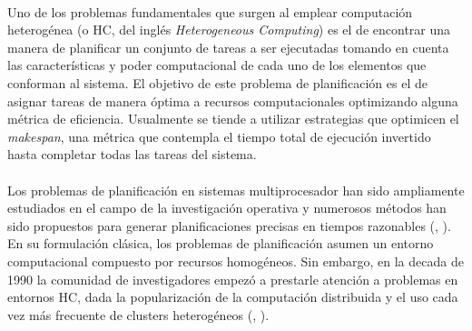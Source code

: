 \paragraph{}Uno de los problemas fundamentales que surgen al emplear computación heterogénea (o HC, del inglés \textit{Heterogeneous Computing}) es el de encontrar una manera de planificar un conjunto de tareas a ser ejecutadas tomando en cuenta las características y poder computacional de cada uno de los elementos que conforman al sistema.
El objetivo de este problema de planificación es el de asignar tareas de manera óptima a recursos computacionales optimizando alguna métrica de eficiencia.
Usualmente se tiende a utilizar estrategias que optimicen el \textit{makespan}, una métrica que contempla el tiempo total de ejecución invertido hasta completar todas las tareas del sistema.

\paragraph{}Los problemas de planificación en sistemas multiprocesador han sido ampliamente estudiados en el campo de la investigación operativa y numerosos métodos han sido propuestos para generar planificaciones precisas en tiempos razonables (\citet{bib-rewini-scheduling}, \citet{bib-leung-handbook}).
En su formulación clásica, los problemas de planificación asumen un entorno computacional compuesto por recursos homogéneos.
Sin embargo, en la decada de 1990 la comunidad de investigadores empezó a prestarle atención a problemas en entornos HC, dada la popularización de la computación distribuida y el uso cada vez más frecuente de clusters heterogéneos (\citet{bib-freund}, \citet{bib-eshaghian-heterogeneous}).

